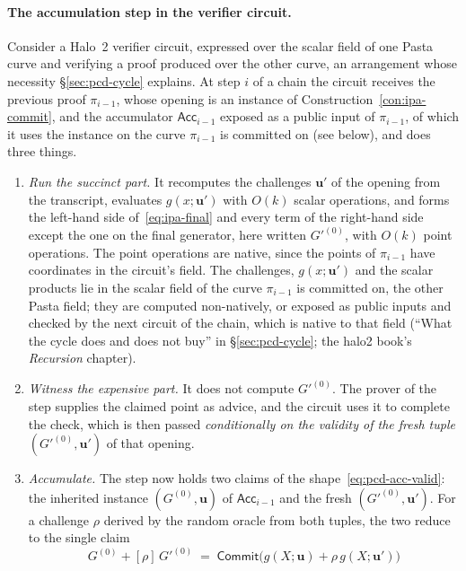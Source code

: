 \documentclass[11pt,a4paper]{article}
\theoremstyle{definition}
\newcommand{\Comm}{\mathsf{Commit}}
\newcommand{\Acc}{\ensuremath{\mathsf{Acc}}}
\begin{document}
\paragraph{The accumulation step in the verifier circuit.}
Consider a Halo~2 verifier circuit, expressed over the scalar field of
one Pasta curve and verifying a proof produced over the other curve, an
arrangement whose necessity \S\ref{sec:pcd-cycle} explains. At step $i$
of a chain the circuit receives the previous proof $\pi_{i-1}$, whose
opening is an instance of Construction~\ref{con:ipa-commit}, and the
accumulator $\Acc_{i-1}$ exposed as a public input of $\pi_{i-1}$, of
which it uses the instance on the curve $\pi_{i-1}$ is committed on (see
below), and does three things.
\begin{enumerate}[leftmargin=*, itemsep=2pt]
\item \emph{Run the succinct part.} It recomputes the challenges
  $\mathbf u'$ of the opening from the transcript, evaluates
  $g(x; \mathbf u')$ with $O(k)$ scalar operations, and forms the
  left-hand side of~\eqref{eq:ipa-final} and every term of the
  right-hand side except the one on the final generator, here written
  $G'^{(0)}$, with $O(k)$ point operations. The point operations are
  native, since the points of $\pi_{i-1}$ have coordinates in the
  circuit's field. The challenges, $g(x; \mathbf u')$ and the scalar
  products lie in the scalar field of the curve $\pi_{i-1}$ is committed
  on, the other Pasta field; they are computed non-natively, or exposed
  as public inputs and checked by the next circuit of the chain, which
  is native to that field (``What the cycle does and does not buy'' in
  \S\ref{sec:pcd-cycle}; the halo2 book's \emph{Recursion} chapter).
\item \emph{Witness the expensive part.} It does not compute
  $G'^{(0)}$. The prover of the step supplies the claimed point as
  advice, and the circuit uses it to complete the check, which is then
  passed \emph{conditionally on the validity of the fresh tuple}
  $(G'^{(0)}, \mathbf u')$ of that opening.
\item \emph{Accumulate.} The step now holds two claims of the
  shape~\eqref{eq:pcd-acc-valid}: the inherited instance
  $(G^{(0)}, \mathbf u)$ of $\Acc_{i-1}$ and the fresh
  $(G'^{(0)}, \mathbf u')$. For a challenge $\rho$ derived by the random
  oracle from both tuples, the two reduce to the single claim
  \begin{equation}\label{eq:pcd-fold}
  G^{(0)} + [\rho]\,G'^{(0)} \;=\; \Comm\bigl(g(X; \mathbf u)
    + \rho\, g(X; \mathbf u')\bigr)

\end{equation}
\end{enumerate}
\end{document}
